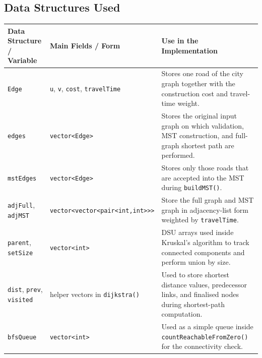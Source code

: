 \documentclass[10pt,a4paper]{article}
\begin{document}
\subsection{Data Structures Used}
\begin{table}[H]
\centering
\scriptsize
\begin{tabularx}{\textwidth}{|p{3.0cm}|p{3.2cm}|X|}
\hline
\textbf{Data Structure / Variable} & \textbf{Main Fields / Form} & \textbf{Use in the Implementation} \\
\hline
\texttt{Edge} & \texttt{u}, \texttt{v}, \texttt{cost}, \texttt{travelTime} & Stores one road of the city graph together with the construction cost and travel-time weight. \\
\hline
\texttt{edges} & \texttt{vector<Edge>} & Stores the original input graph on which validation, MST construction, and full-graph shortest path are performed. \\
\hline
\texttt{mstEdges} & \texttt{vector<Edge>} & Stores only those roads that are accepted into the MST during \texttt{buildMST()}. \\
\hline
\texttt{adjFull}, \texttt{adjMST} & \texttt{vector<vector<pair<int,int>>>} & Store the full graph and MST graph in adjacency-list form weighted by \texttt{travelTime}. \\
\hline
\texttt{parent}, \texttt{setSize} & \texttt{vector<int>} & DSU arrays used inside Kruskal's algorithm to track connected components and perform union by size. \\
\hline
\texttt{dist}, \texttt{prev}, \texttt{visited} & helper vectors in \texttt{dijkstra()} & Used to store shortest distance values, predecessor links, and finalised nodes during shortest-path computation. \\
\hline
\texttt{bfsQueue} & \texttt{vector<int>} & Used as a simple queue inside \texttt{countReachableFromZero()} for the connectivity check. \\
\hline
\end{tabularx}
\end{table}
\end{document}
